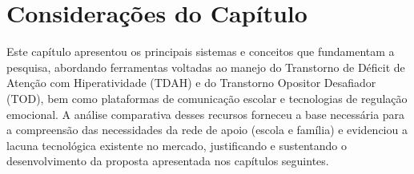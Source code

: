 \vspace{0.3cm}
\section{Considerações do Capítulo}

Este capítulo apresentou os principais sistemas e conceitos que fundamentam a pesquisa, abordando ferramentas voltadas ao manejo do Transtorno de Déficit de Atenção com Hiperatividade (TDAH) e do Transtorno Opositor Desafiador (TOD), bem como plataformas de comunicação escolar e tecnologias de regulação emocional. A análise comparativa desses recursos forneceu a base necessária para a compreensão das necessidades da rede de apoio (escola e família) e evidenciou a lacuna tecnológica existente no mercado, justificando e sustentando o desenvolvimento da proposta apresentada nos capítulos seguintes.